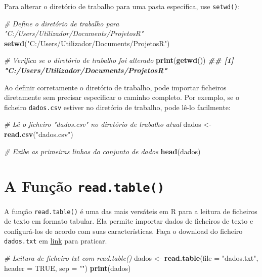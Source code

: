 \documentclass[
]{book}
\newenvironment{Shaded}{\begin{snugshade}}{\end{snugshade}}
\newcommand{\AttributeTok}[1]{\textcolor[rgb]{0.13,0.29,0.53}{#1}}
\newcommand{\CommentTok}[1]{\textcolor[rgb]{0.56,0.35,0.01}{\textit{#1}}}
\newcommand{\ConstantTok}[1]{\textcolor[rgb]{0.56,0.35,0.01}{#1}}
\newcommand{\DocumentationTok}[1]{\textcolor[rgb]{0.56,0.35,0.01}{\textbf{\textit{#1}}}}
\newcommand{\FunctionTok}[1]{\textcolor[rgb]{0.13,0.29,0.53}{\textbf{#1}}}
\newcommand{\NormalTok}[1]{#1}
\newcommand{\OtherTok}[1]{\textcolor[rgb]{0.56,0.35,0.01}{#1}}
\newcommand{\StringTok}[1]{\textcolor[rgb]{0.31,0.60,0.02}{#1}}
\begin{document}
Para alterar o diretório de trabalho para uma pasta específica, use
\texttt{setwd()}:

\begin{Shaded}
\begin{Highlighting}[]
\CommentTok{\# Define o diretório de trabalho para "C:/Users/Utilizador/Documents/ProjetosR"}
\FunctionTok{setwd}\NormalTok{(}\StringTok{"C:/Users/Utilizador/Documents/ProjetosR"}\NormalTok{)}

\CommentTok{\# Verifica se o diretório de trabalho foi alterado}
\FunctionTok{print}\NormalTok{(}\FunctionTok{getwd}\NormalTok{())}
\DocumentationTok{\#\# [1] "C:/Users/Utilizador/Documents/ProjetosR"}
\end{Highlighting}
\end{Shaded}

Ao definir corretamente o diretório de trabalho, pode importar ficheiros
diretamente sem precisar especificar o caminho completo. Por exemplo, se
o ficheiro \texttt{dados.csv} estiver no diretório de trabalho, pode lê-lo
facilmente:

\begin{Shaded}
\begin{Highlighting}[]
\CommentTok{\# Lê o ficheiro "dados.csv" no diretório de trabalho atual}
\NormalTok{dados }\OtherTok{\textless{}{-}} \FunctionTok{read.csv}\NormalTok{(}\StringTok{"dados.csv"}\NormalTok{)}

\CommentTok{\# Exibe as primeiras linhas do conjunto de dados}
\FunctionTok{head}\NormalTok{(dados)}
\end{Highlighting}
\end{Shaded}

\section{\texorpdfstring{A Função \texttt{read.table()}}{A Função read.table()}}\label{a-funuxe7uxe3o-read.table}

A função \texttt{read.table()} é uma das mais versáteis em R para a leitura de
ficheiros de texto em formato tabular. Ela permite importar dados de
ficheiros de texto e configurá-los de acordo com suas características.
Faça o download do ficheiro \texttt{dados.txt} em
\href{https://renatorpaula.wixsite.com/renato/laboratorio-estatistica}{link}
para praticar.

\begin{Shaded}
\begin{Highlighting}[]
\CommentTok{\# Leitura de ficheiro txt com read.table()}
\NormalTok{dados }\OtherTok{\textless{}{-}} \FunctionTok{read.table}\NormalTok{(}\AttributeTok{file =} \StringTok{"dados.txt"}\NormalTok{, }\AttributeTok{header =} \ConstantTok{TRUE}\NormalTok{, }\AttributeTok{sep =} \StringTok{""}\NormalTok{)}
\FunctionTok{print}\NormalTok{(dados)}
\end{Highlighting}
\end{Shaded}
\end{document}
